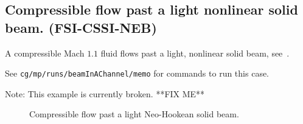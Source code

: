 \subsection{Compressible flow past a light nonlinear solid beam. (FSI-CSSI-NEB)} \label{sec:compressibleFlowPastSolidBeam}


A compressible Mach $1.1$ fluid flows past a light, nonlinear solid beam, see~\cite{flunsi2016}.

\mni
See {\tt cg/mp/runs/beamInAChannel/memo} for commands to run this case.

\mni
{\red Note:} This example is currently broken. **FIX ME**
 


{
\newcommand{\figSize}{5cm}
\newcommand{\cxa}{.0}
\newcommand{\cxb}{.0}
\newcommand{\cya}{.0}
\newcommand{\cyb}{.0}

\begin{figure}[htb]
\begin{center}
\end{center}
\caption{Compressible flow past a light Neo-Hookean solid beam.}
\label{fig:compressibleFlowPastBeam}
\end{figure}
}
